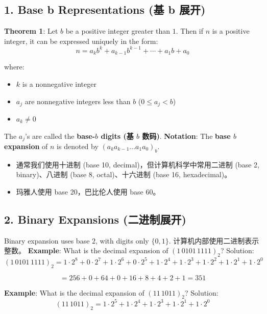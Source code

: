 \documentclass[10pt,a4paper,openany]{ctexbook}
\theoremstyle{definition}
\theoremstyle{remark}
\begin{document}
\vspace{-2pt}

\subsection{1. Base b Representations (基 b 展开)}

\textbf{Theorem 1}: Let $b$ be a positive integer greater than $1$. Then if $n$ is a positive integer, it can be expressed uniquely in the form:
\[
n = a_k b^k + a_{k-1} b^{k-1} + \cdots + a_1 b + a_0
\]

where:
\begin{itemize}
\item $k$ is a nonnegative integer
\item $a_j$ are nonnegative integers less than $b$ ($0 \leq a_j < b$)
\item $a_k \neq 0$

\end{itemize}

The $a_j$'s are called the \textbf{base-$b$ digits (基 $b$ 数码)}.
\textbf{Notation}: The \textbf{base $b$ expansion} of $n$ is denoted by $(a_k a_{k-1} \dots a_1 a_0)_b$.
\begin{itemize}
\item 通常我们使用十进制 (base 10, decimal)，但计算机科学中常用二进制 (base 2, binary)、八进制 (base 8, octal)、十六进制 (base 16, hexadecimal)。
\item 玛雅人使用 base 20，巴比伦人使用 base 60。

\end{itemize}

\vspace{-2pt}

\subsection{2. Binary Expansions (二进制展开)}

Binary expansion uses base $2$, with digits only $\{0, 1\}$.
计算机内部使用二进制表示整数。
\textbf{Example}: What is the decimal expansion of $(1\,0101\,1111)_2$?
Solution:
\[
(1\,0101\,1111)_2 = 1 \cdot 2^8 + 0 \cdot 2^7 + 1 \cdot 2^6 + 0 \cdot 2^5 + 1 \cdot 2^4 + 1 \cdot 2^3 + 1 \cdot 2^2 + 1 \cdot 2^1 + 1 \cdot 2^0
\]

\[
= 256 + 0 + 64 + 0 + 16 + 8 + 4 + 2 + 1 = 351
\]

\textbf{Example}: What is the decimal expansion of $(11\,1011)_2$?
Solution:
\[
(11\,1011)_2 = 1 \cdot 2^5 + 1 \cdot 2^4 + 1 \cdot 2^3 + 1 \cdot 2^1 + 1 \cdot 2^0
\]
\end{document}
